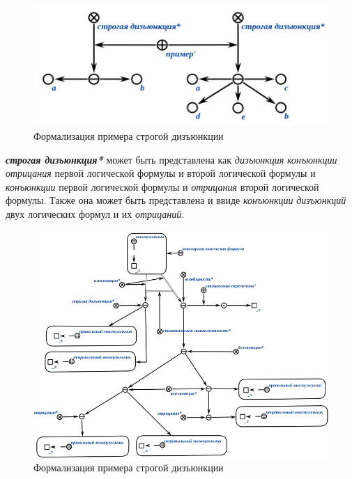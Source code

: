 \begin{figure}[http]
	\includegraphics[scale=0.8]{author/part2/figures/logic/strictDisjunction.png}
	\caption{Формализация примера строгой дизъюнкции}
	\label{fig:strict_disjunction}
\end{figure}


\textbf{\textit{строгая дизъюнкция*}} может быть представлена как \textit{дизъюнкция} \textit{конъюнкции} \textit{отрицания} первой логической формулы и второй логической формулы и \textit{конъюнкции} первой логической формулы и \textit{отрицания} второй логической формулы. Также она может быть представлена и ввиде \textit{конъюнкции} \textit{дизъюнкций} двух логических формул и их \textit{отрицаний}.

\begin{figure}[http]
	\includegraphics[scale=0.8]{author/part2/figures/logic/strict_disjunction_representation.png}
	\caption{Формализация примера строгой дизъюнкции}
	\label{fig:strict_disjunction_representation}
\end{figure}

\begin{SCn}
\end{SCn}


